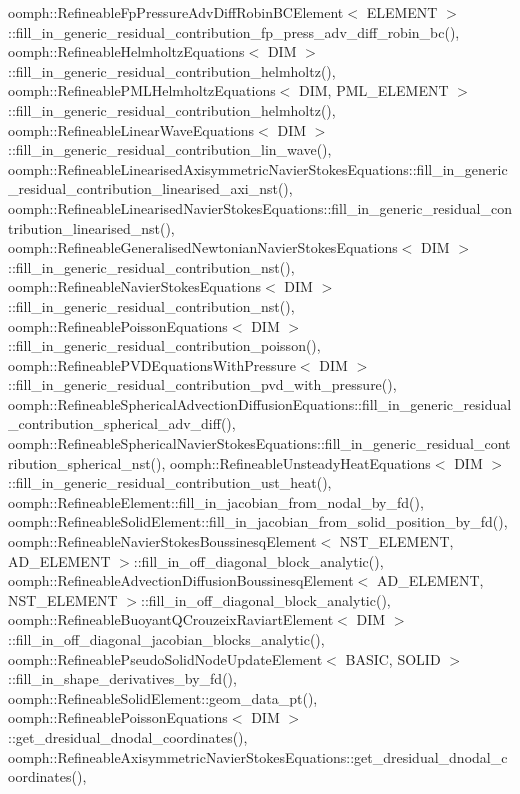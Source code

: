 oomph\+::\+Refineable\+Fp\+Pressure\+Adv\+Diff\+Robin\+B\+C\+Element$<$ E\+L\+E\+M\+E\+N\+T $>$\+::fill\+\_\+in\+\_\+generic\+\_\+residual\+\_\+contribution\+\_\+fp\+\_\+press\+\_\+adv\+\_\+diff\+\_\+robin\+\_\+bc(), oomph\+::\+Refineable\+Helmholtz\+Equations$<$ D\+I\+M $>$\+::fill\+\_\+in\+\_\+generic\+\_\+residual\+\_\+contribution\+\_\+helmholtz(), oomph\+::\+Refineable\+P\+M\+L\+Helmholtz\+Equations$<$ D\+I\+M, P\+M\+L\+\_\+\+E\+L\+E\+M\+E\+N\+T $>$\+::fill\+\_\+in\+\_\+generic\+\_\+residual\+\_\+contribution\+\_\+helmholtz(), oomph\+::\+Refineable\+Linear\+Wave\+Equations$<$ D\+I\+M $>$\+::fill\+\_\+in\+\_\+generic\+\_\+residual\+\_\+contribution\+\_\+lin\+\_\+wave(), oomph\+::\+Refineable\+Linearised\+Axisymmetric\+Navier\+Stokes\+Equations\+::fill\+\_\+in\+\_\+generic\+\_\+residual\+\_\+contribution\+\_\+linearised\+\_\+axi\+\_\+nst(), oomph\+::\+Refineable\+Linearised\+Navier\+Stokes\+Equations\+::fill\+\_\+in\+\_\+generic\+\_\+residual\+\_\+contribution\+\_\+linearised\+\_\+nst(), oomph\+::\+Refineable\+Generalised\+Newtonian\+Navier\+Stokes\+Equations$<$ D\+I\+M $>$\+::fill\+\_\+in\+\_\+generic\+\_\+residual\+\_\+contribution\+\_\+nst(), oomph\+::\+Refineable\+Navier\+Stokes\+Equations$<$ D\+I\+M $>$\+::fill\+\_\+in\+\_\+generic\+\_\+residual\+\_\+contribution\+\_\+nst(), oomph\+::\+Refineable\+Poisson\+Equations$<$ D\+I\+M $>$\+::fill\+\_\+in\+\_\+generic\+\_\+residual\+\_\+contribution\+\_\+poisson(), oomph\+::\+Refineable\+P\+V\+D\+Equations\+With\+Pressure$<$ D\+I\+M $>$\+::fill\+\_\+in\+\_\+generic\+\_\+residual\+\_\+contribution\+\_\+pvd\+\_\+with\+\_\+pressure(), oomph\+::\+Refineable\+Spherical\+Advection\+Diffusion\+Equations\+::fill\+\_\+in\+\_\+generic\+\_\+residual\+\_\+contribution\+\_\+spherical\+\_\+adv\+\_\+diff(), oomph\+::\+Refineable\+Spherical\+Navier\+Stokes\+Equations\+::fill\+\_\+in\+\_\+generic\+\_\+residual\+\_\+contribution\+\_\+spherical\+\_\+nst(), oomph\+::\+Refineable\+Unsteady\+Heat\+Equations$<$ D\+I\+M $>$\+::fill\+\_\+in\+\_\+generic\+\_\+residual\+\_\+contribution\+\_\+ust\+\_\+heat(), oomph\+::\+Refineable\+Element\+::fill\+\_\+in\+\_\+jacobian\+\_\+from\+\_\+nodal\+\_\+by\+\_\+fd(), oomph\+::\+Refineable\+Solid\+Element\+::fill\+\_\+in\+\_\+jacobian\+\_\+from\+\_\+solid\+\_\+position\+\_\+by\+\_\+fd(), oomph\+::\+Refineable\+Navier\+Stokes\+Boussinesq\+Element$<$ N\+S\+T\+\_\+\+E\+L\+E\+M\+E\+N\+T, A\+D\+\_\+\+E\+L\+E\+M\+E\+N\+T $>$\+::fill\+\_\+in\+\_\+off\+\_\+diagonal\+\_\+block\+\_\+analytic(), oomph\+::\+Refineable\+Advection\+Diffusion\+Boussinesq\+Element$<$ A\+D\+\_\+\+E\+L\+E\+M\+E\+N\+T, N\+S\+T\+\_\+\+E\+L\+E\+M\+E\+N\+T $>$\+::fill\+\_\+in\+\_\+off\+\_\+diagonal\+\_\+block\+\_\+analytic(), oomph\+::\+Refineable\+Buoyant\+Q\+Crouzeix\+Raviart\+Element$<$ D\+I\+M $>$\+::fill\+\_\+in\+\_\+off\+\_\+diagonal\+\_\+jacobian\+\_\+blocks\+\_\+analytic(), oomph\+::\+Refineable\+Pseudo\+Solid\+Node\+Update\+Element$<$ B\+A\+S\+I\+C, S\+O\+L\+I\+D $>$\+::fill\+\_\+in\+\_\+shape\+\_\+derivatives\+\_\+by\+\_\+fd(), oomph\+::\+Refineable\+Solid\+Element\+::geom\+\_\+data\+\_\+pt(), oomph\+::\+Refineable\+Poisson\+Equations$<$ D\+I\+M $>$\+::get\+\_\+dresidual\+\_\+dnodal\+\_\+coordinates(), oomph\+::\+Refineable\+Axisymmetric\+Navier\+Stokes\+Equations\+::get\+\_\+dresidual\+\_\+dnodal\+\_\+coordinates(), 